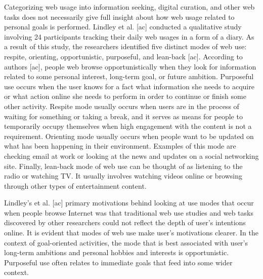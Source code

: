 \documentclass{casconpaper}
\begin{document}
{Categorizing web usage into information seeking,  digital curation, and other web tasks does not necessarily give full insight about how web usage related to personal goals is performed. Lindley et al. [ac] conducted a qualitative study involving 24 participants tracking their daily web usages in a form of a diary. As a result of this study, the researchers identified five distinct modes of web use: respite, orienting, opportunistic, purposeful, and lean-back [ac]. According to authors [ac], people web browse opportunistically when they look for information related to some personal interest, long-term goal, or future ambition. Purposeful use occurs when the user knows for a fact what information she needs to acquire or what action online she needs to perform in order to continue or finish some other activity. Respite mode usually occurs when users are in the process of waiting for something or taking a break, and it serves as means for people to temporarily occupy themselves when high engagement with the content is not a requirement. Orienting mode usually occurs when people want to be updated on what has been happening in their environment. Examples of this mode are checking email at work or looking at the news and updates on a social networking site. Finally, lean-back mode of web use can be thought of as listening to the radio or watching TV. It usually involves watching videos online or browsing through other types of entertainment content. 

Lindley’s et al. [ac] primary motivations behind looking at use modes that occur when people browse Internet was that traditional web use studies and web tasks discovered by other researchers could not reflect the depth of user’s intentions online. It is evident that modes of web use make user’s motivations clearer. In the context of goal-oriented activities, the mode that is best associated with user’s long-term ambitions and personal hobbies and interests is opportunistic. Purposeful use often relates to immediate goals that feed into some wider context. 

}
\end{document}
